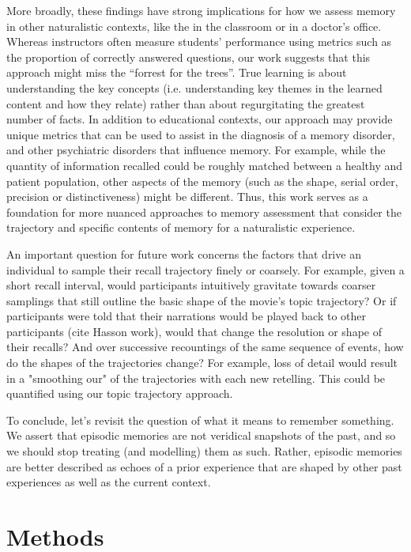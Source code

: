\documentclass{article}
\begin{document}
{More broadly, these findings have strong implications for how we assess memory in other naturalistic contexts, like the in the classroom or in a doctor's office.  Whereas instructors often measure students' performance using metrics such as the proportion of correctly answered questions, our work suggests that this approach might miss the ``forrest for the trees''. True learning is about understanding the key concepts (i.e. understanding key themes in the learned content and how they relate) rather than about regurgitating the greatest number of facts. In addition to educational contexts, our approach may provide unique metrics that can be used to assist in the diagnosis of a memory disorder, and other psychiatric disorders that influence memory. For example, while the quantity of information recalled could be roughly matched between a healthy and patient population, other aspects of the memory (such as the shape, serial order, precision or distinctiveness) might be different. Thus, this work serves as a foundation for more nuanced approaches to memory assessment that consider the trajectory and specific contents of memory for a naturalistic experience.

An important question for future work concerns the factors that drive an individual to sample their recall trajectory finely or coarsely. For example, given a short recall interval, would participants intuitively gravitate towards coarser samplings that still outline the basic shape of the movie's topic trajectory? Or if participants were told that their narrations would be played back to other participants (cite Hasson work), would that change the resolution or shape of their recalls? And over successive recountings of the same sequence of events, how do the shapes of the trajectories change? For example, loss of detail would result in a "smoothing our" of the trajectories with each new retelling. This could be quantified using our topic trajectory approach.


To conclude, let's revisit the question of what it means to remember something. We assert that episodic memories are not veridical snapshots of the past, and so we should stop treating (and modelling) them as such.  Rather, episodic memories are better described as echoes of a prior experience that are shaped by other past experiences as well as the current context.

\section{Methods}
\label{sec:methods}

}
\end{document}
